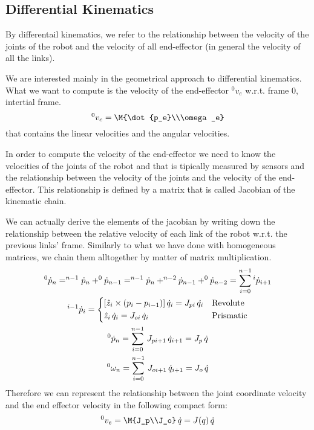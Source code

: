 \subsection{Differential Kinematics}

By differentail kinematics, we refer to the relationship between the velocity of the joints of the robot and the velocity of all end-effector (in general the velocity of all the links).

We are interested mainly in the geometrical approach to differential kinematics.
What we want to compute is the velocity of the end-effector $^0v_e$ w.r.t. frame 0, intertial frame.
\[^0v_e = \M{\dot{p_e}\\\omega_e}\]
that contains the linear velocities and the angular velocities.

In order to compute the velocity of the end-effector we need to know the velocities of the joints of the robot and that is tipically measured by sensors and the relationship between the velocity of the joints and the velocity of the end-effector.
This relationship is defined by  a matrix that is called Jacobian of the kinematic chain.

We can actually derive the elements of the jacobian by writing down the relationship between the relative velocity of each link of the robot w.r.t. the previous links' frame.
Similarly to what we have done with homogeneous matrices, we chain them alltogether by matter of matrix multiplication.
\begin{gather}
^0\dot{p}_n = ^{n-1}\dot{p}_n + ^0\dot{p}_{n-1} = ^{n-1}\dot{p}_n + ^{n-2}\dot{p}_{n-1} + ^0\dot{p}_{n-2} = \sum_{i=0}^{n-1} {^i\dot{p}_{i+1}}\\
^{i-1}\dot{p}_i = \begin{dcases}
[\hat{z}_i \times (p_i - p_{i-1})]\,\dot{q}_i = J_{pi}\,\dot{q_i}&\text{Revolute}\\
\hat{z}_i\,\dot{q}_i = J_{oi} \,\dot{q}_i&\text{Prismatic}
\end{dcases}\\
^0\dot{p}_n = \sum_{i=0}^{n-1}\,J_{pi+1}\,\dot{q}_{i+1} = J_p\,\dot{q}\\
^0\omega_n = \sum_{i=0}^{n-1}\,J_{oi+1}\,\dot{q}_{i+1} = J_o\,\dot{q}
\end{gather}
Therefore we can represent the relationship between the joint coordinate velocity and the end effector velocity in the following compact form:
\[^0v_e = \M{J_p\\J_o}\,\dot{q} = J(q)\,\dot{q}\]

